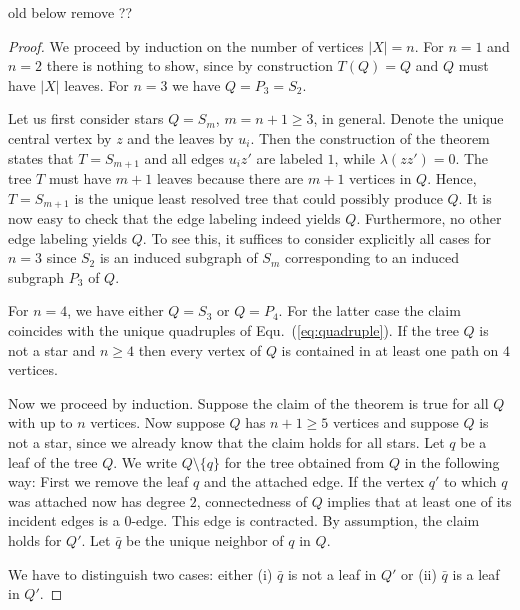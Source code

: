 \documentclass[smallextended]{svjour3}
\newcommand{\remove}[1]{\begingroup\tiny\color{yellow}#1\endgroup}
\begin{document}
\remove{old below  remove ?? 
\begin{proof}
  We proceed by induction on the number of vertices $|X|=n$.  For $n=1$ and
  $n=2$ there is nothing to show, since by construction $T(Q)=Q$ and $Q$
  must have $|X|$ leaves.  For $n=3$ we have $Q=P_3=S_2$.

  Let us first consider stars $Q=S_m$, $m=n+1\ge 3$, in general. Denote the
  unique central vertex by $z$ and the leaves by $u_i$. Then the
  construction of the theorem states that $T=S_{m+1}$ and all edges $u_iz'$
  are labeled $1$, while $\lambda(zz')=0$. The tree $T$ must have $m+1$
  leaves because there are $m+1$ vertices in $Q$. Hence, $T=S_{m+1}$ is the
  unique least resolved tree that could possibly produce $Q$. It is now
  easy to check that the edge labeling indeed yields $Q$. Furthermore, no
  other edge labeling yields $Q$. To see this, it suffices to consider
  explicitly all cases for $n=3$ since $S_2$ is an induced subgraph of
  $S_m$ corresponding to an induced subgraph $P_3$ of $Q$.

  For $n=4$, we have either $Q=S_3$ or $Q=P_4$. For the latter case the
  claim coincides with the unique quadruples of Equ.~(\ref{eq:quadruple}).
  If the tree $Q$ is not a star and $n\ge 4$ then every vertex of $Q$ is
  contained in at least one path on $4$ vertices.

  Now we proceed by induction. Suppose the claim of the theorem is true for
  all $Q$ with up to $n$ vertices. Now suppose $Q$ has $n+1\ge 5$ vertices
  and suppose $Q$ is not a star, since we already know that the claim holds
  for all stars. Let $q$ be a leaf of the tree $Q$. We write
  $Q\setminus\{q\}$ for the tree obtained from $Q$ in the following way:
  First we remove the leaf $q$ and the attached edge. If the vertex $q'$ to
  which $q$ was attached now has degree $2$, connectedness of $Q$ implies
  that at least one of its incident edges is a 0-edge. This edge is
  contracted.  By assumption, the claim holds for $Q'$. Let $\bar q$ be the
  unique neighbor of $q$ in $Q$.
 
  We have to distinguish two cases: either (i) $\bar q$ is not a leaf in
  $Q'$ or (ii) $\bar q$ is a leaf in $Q'$.


\end{proof}}
\end{document}
